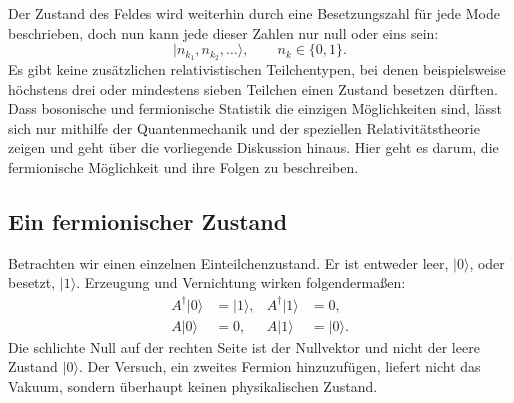 Der Zustand des Feldes wird weiterhin durch eine Besetzungszahl für jede Mode beschrieben, doch nun kann jede dieser Zahlen nur null oder eins sein:
\begin{equation}
|n_{k_1},n_{k_2},\ldots\rangle,
\qquad n_k\in\{0,1\}.
\end{equation}
Es gibt keine zusätzlichen relativistischen Teilchentypen, bei denen beispielsweise höchstens drei oder mindestens sieben Teilchen einen Zustand besetzen dürften. Dass bosonische und fermionische Statistik die einzigen Möglichkeiten sind, lässt sich nur mithilfe der Quantenmechanik und der speziellen Relativitätstheorie zeigen und geht über die vorliegende Diskussion hinaus. Hier geht es darum, die fermionische Möglichkeit und ihre Folgen zu beschreiben.

\subsection{Ein fermionischer Zustand}

Betrachten wir einen einzelnen Einteilchenzustand. Er ist entweder leer, \(|0\rangle\), oder besetzt, \(|1\rangle\). Erzeugung und Vernichtung wirken folgendermaßen:
\begin{align}
A^\dagger|0\rangle&=|1\rangle,
&
A^\dagger|1\rangle&=0,
\\
A|0\rangle&=0,
&
A|1\rangle&=|0\rangle.
\end{align}
Die schlichte Null auf der rechten Seite ist der Nullvektor und nicht der leere Zustand \(|0\rangle\). Der Versuch, ein zweites Fermion hinzuzufügen, liefert nicht das Vakuum, sondern überhaupt keinen physikalischen Zustand.

\begin{classroomqa}
\end{classroomqa}

\begin{classroomqa}
\end{classroomqa}

